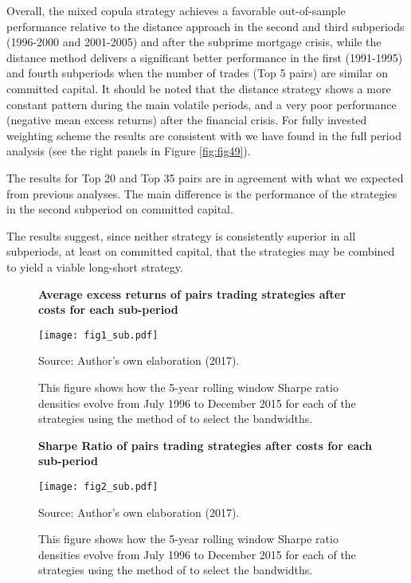 \documentclass[a4paper,12pt]{report}
\begin{document}
Overall, the mixed copula strategy achieves a favorable out-of-sample performance relative to the distance approach in the second and third subperiods (1996-2000 and 2001-2005) and after the subprime mortgage crisis, while the distance method delivers a significant better performance in the first (1991-1995) and fourth subperiods when the number of trades (Top 5 pairs) are similar on committed capital. It should be noted that the distance strategy shows a more constant pattern during the main volatile periods, and a very poor performance (negative mean excess returns) after the financial crisis. For fully invested weighting scheme the results are consistent with we have found in the full period analysis (see the right panels in Figure \ref{fig:fig49}).

The results for Top 20 and Top 35 pairs are in agreement with what we expected from previous analyses. The main difference is the performance of the strategies in the second subperiod on committed capital.

The results suggest, since neither strategy is consistently superior in all subperiods, at least on committed capital, that the strategies may be combined to yield a viable long-short strategy.

\begin{figure}[H]
	\centering
	\caption{\textbf{Average excess returns of pairs trading strategies after costs for each sub-period}}
	\texttt{[image: fig1\_sub.pdf]}
	\captionsetup{justification=raggedright,
		singlelinecheck=false
	}
	\caption*{Source: Author's own elaboration (2017).}
	\caption*{\scriptsize This figure shows how the 5-year rolling window Sharpe ratio densities evolve from July 1996 to December 2015 for each of the strategies using the method of \citet*{sj1991} to select the bandwidths.}
	\label{fig:fig6}
\end{figure}

\begin{figure}[H]
	\centering
	\caption{\textbf{Sharpe Ratio of pairs trading strategies after costs for each sub-period}}
	\texttt{[image: fig2\_sub.pdf]}
	\captionsetup{justification=raggedright,
		singlelinecheck=false
	}
	\caption*{Source: Author's own elaboration (2017).}
	\caption*{\scriptsize This figure shows how the 5-year rolling window Sharpe ratio densities evolve from July 1996 to December 2015 for each of the strategies using the method of \citet*{sj1991} to select the bandwidths.}
	\label{fig:fig7}
\end{figure}
\end{document}
